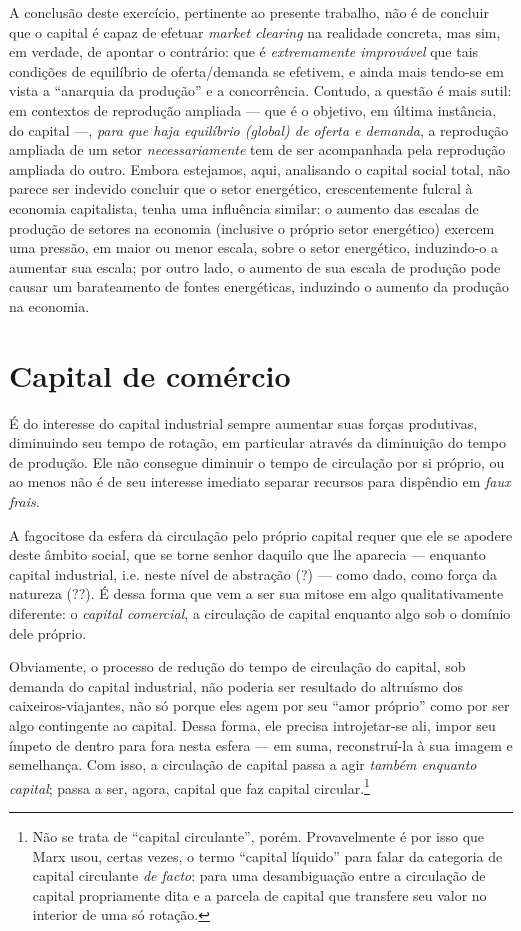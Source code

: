 A conclusão deste exercício, pertinente ao presente trabalho, não é de concluir que o capital é capaz de efetuar \emph{market clearing} na realidade concreta, mas sim, em verdade, de apontar o contrário: que é \textit{extremamente improvável} que tais condições de equilíbrio de oferta/demanda se efetivem, e ainda mais tendo-se em vista a ``anarquia da produção'' e a concorrência. Contudo, a questão é mais sutil: em contextos de reprodução ampliada --- que é o objetivo, em última instância, do capital ---, \textit{para que haja equilíbrio (global) de oferta e demanda}, a reprodução ampliada de um setor \textit{necessariamente} tem de ser acompanhada pela reprodução ampliada do outro. Embora estejamos, aqui, analisando o capital social total, não parece ser indevido concluir que o setor energético, crescentemente fulcral à economia capitalista, tenha uma influência similar: o aumento das escalas de produção de setores na economia (inclusive o próprio setor energético) exercem uma pressão, em maior ou menor escala, sobre o setor energético, induzindo-o a aumentar sua escala; por outro lado, o aumento de sua escala de produção pode causar um barateamento de fontes energéticas, induzindo o aumento da produção na economia. 


\section{Capital de comércio}
É do interesse do capital industrial sempre aumentar suas forças produtivas, diminuindo seu tempo de rotação, em particular através da diminuição do tempo de produção. Ele não consegue diminuir o tempo de circulação por si próprio, ou ao menos não é de seu interesse imediato separar recursos para dispêndio em \textit{faux frais}. 

A fagocitose da esfera da circulação pelo próprio capital requer que ele se apodere deste âmbito social, que se torne senhor daquilo que lhe aparecia --- enquanto capital industrial, i.e. neste nível de abstração (?) --- como dado, como força da natureza (??). É dessa forma que vem a ser sua mitose em algo qualitativamente diferente: o \textit{capital comercial}, a circulação de capital enquanto algo sob o domínio dele próprio.

Obviamente, o processo de redução do tempo de circulação do capital, sob demanda do capital industrial, não poderia ser resultado do altruísmo dos caixeiros-viajantes, não só porque eles agem por seu ``amor próprio'' como por ser algo contingente ao capital. Dessa forma, ele precisa introjetar-se ali, impor seu ímpeto de dentro para fora nesta esfera --- em suma, reconstruí-la à sua imagem e semelhança. Com isso, a circulação de capital passa a agir \textit{também enquanto capital}; passa a ser, agora, capital que faz capital circular.\footnote{Não se trata de ``capital circulante'', porém. Provavelmente é por isso que Marx usou, certas vezes, o termo ``capital líquido'' para falar da categoria de capital circulante \textit{de facto}: para uma desambiguação entre a circulação de capital propriamente dita e a parcela de capital que transfere seu valor no interior de uma só rotação.}

